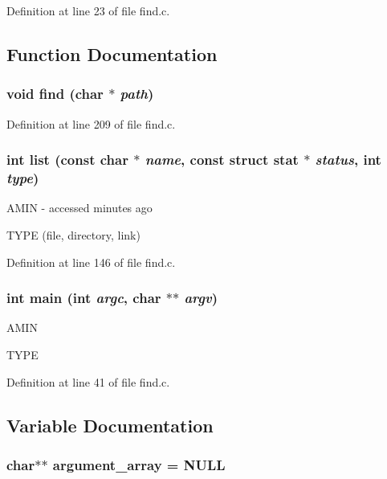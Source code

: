 Definition at line 23 of file find.c.



\subsection{Function Documentation}
\subsubsection[{find}]{\setlength{\rightskip}{0pt plus 5cm}void find (char $\ast$ {\em path})}\label{find_8c_a0558dd3968c3b34d83f9b71386b820c3}


Definition at line 209 of file find.c.

\subsubsection[{list}]{\setlength{\rightskip}{0pt plus 5cm}int list (const char $\ast$ {\em name}, \/  const struct stat $\ast$ {\em status}, \/  int {\em type})}\label{find_8c_a8a9d45da6761b61c8bfaccdd02d3de74}


AMIN -\/ accessed minutes ago

TYPE (file, directory, link) 



Definition at line 146 of file find.c.

\subsubsection[{main}]{\setlength{\rightskip}{0pt plus 5cm}int main (int {\em argc}, \/  char $\ast$$\ast$ {\em argv})}\label{find_8c_a3c04138a5bfe5d72780bb7e82a18e627}


AMIN

TYPE 



Definition at line 41 of file find.c.



\subsection{Variable Documentation}
\subsubsection[{argument\_\-array}]{\setlength{\rightskip}{0pt plus 5cm}char$\ast$$\ast$ {\bf argument\_\-array} = NULL}\label{find_8c_a6ae1ac1cb9e02803954fe57a39755a53}


